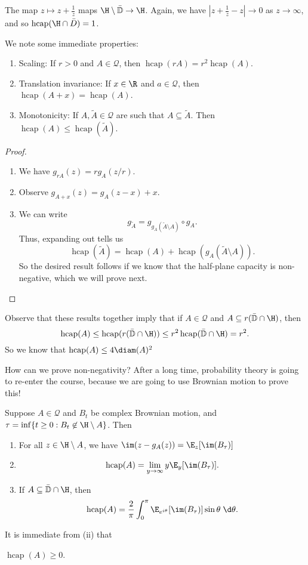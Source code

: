 \documentclass[a4paper]{article}
\renewcommand\D{\mathbb{D}}
\DeclareMathOperator\hcap{hcap}
\begin{document}
\begin{eg}
  The map $z \mapsto z + \frac{1}{z}$ maps $\H \setminus \bar{\D} \to \H$. Again, we have $|z + \frac{1}{z} - z| \to 0$ as $z \to \infty$, and so $\hcap(\H \cap \bar{D}) = 1$.
\end{eg}
We note some immediate properties:
\begin{prop}\leavevmode
  \begin{enumerate}
    \item Scaling: If $r > 0$ and $A \in \mathcal{Q}$, then $\hcap(rA) = r^2 \hcap(A)$.
    \item Translation invariance: If $x \in \R$ and $a \in \mathcal{Q}$, then $\hcap(A + x) = \hcap(A)$.
    \item Monotonicity: If $A, \tilde{A} \in \mathcal{Q}$ are such that $A \subseteq \tilde{A}$. Then $\hcap(A) \leq \hcap(\tilde{A})$.
  \end{enumerate}
\end{prop}

\begin{proof}\leavevmode
  \begin{enumerate}
    \item We have $g_{rA}(z) = r g_A(z/r)$.
    \item Observe $g_{A + x}(z) = g_A(z - x) + x$.
    \item We can write
      \[
        g_{\tilde{A}} = g_{g_A(\tilde{A} \setminus A)} \circ g_A.
      \]
      Thus, expanding out tells us
      \[
        \hcap(\tilde{A}) = \hcap(A) + \hcap(g_A(\tilde{A}\setminus A)).
      \]
      So the desired result follows if we know that the half-plane capacity is non-negative, which we will prove next.\qedhere
  \end{enumerate}
\end{proof}
Observe that these results together imply that if $A \in \mathcal{Q}$ and $A \subseteq r(\bar{\D} \cap \H)$, then
\[
  \hcap(A) \leq \hcap(r(\bar{\D} \cap \H)) \leq r^2 \hcap (\bar{\D} \cap \H) = r^2.
\]
So we know that $\hcap(A) \leq 4 \diam(A)^2$

How can we prove non-negativity? After a long time, probability theory is going to re-enter the course, because we are going to use Brownian motion to prove this!

\begin{prop}
  Suppose $A \in \mathcal{Q}$ and $B_t$ be complex Brownian motion, and $\tau = \inf\{t \geq 0: B_t \not \in \H \setminus A\}$. Then
  \begin{enumerate}
    \item For all $z \in \H \setminus A$, we have $\im(z - g_A(z)) = \E_z[\im(B_\tau)]$
    \item
      \[
        \hcap(A) = \lim_{y \to \infty} y \E_y[\im(B_\tau)].
      \]
    \item If $A \subseteq \bar{\D} \cap \H$, then
      \[
        \hcap(A) = \frac{2}{\pi} \int_0^\pi \E_{e^{i\theta}}[\im(B_\tau)]\sin \theta \;\d \theta.
      \]
  \end{enumerate}
\end{prop}
It is immediate from (ii) that
\begin{cor}
  $\hcap(A) \geq 0$.
\end{cor}
\end{document}
